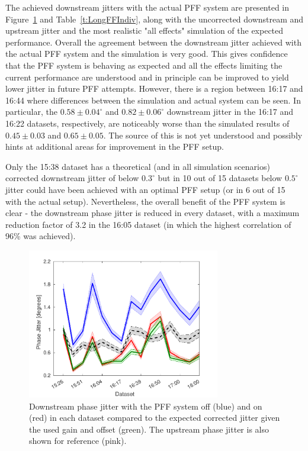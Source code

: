 The achieved downstream jitters with the actual PFF system are presented in Figure~\ref{f:longFF_jitDatSet} and Table~\ref{t:LongFFIndiv}, along with the uncorrected downstream and upstream jitter and the most realistic "all effects" simulation of the expected performance. Overall the agreement between the downstream jitter achieved with the actual PFF system and the simulation is very good. This gives confidence that the PFF system is behaving as expected and all the effects limiting the current performance are understood and in principle can be improved to yield lower jitter in future PFF attempts. However, there is a region between 16:17 and 16:44 where differences between the simulation and actual system can be seen. In particular, the \(0.58\pm0.04^\circ\) and \(0.82\pm0.06^\circ\) downstream jitter in the 16:17 and 16:22 datasets, respectively, are noticeably worse than the simulated results of \(0.45\pm0.03\) and \(0.65\pm0.05\). The source of this is not yet understood and possibly hints at additional areas for improvement in the PFF setup.

Only the 15:38 dataset has a theoretical (and in all simulation scenarios) corrected downstream jitter of below \(0.3^\circ\) but in 10 out of 15 datasets below \(0.5^\circ\) jitter could have been achieved with an optimal PFF setup (or in 6 out of 15 with the actual setup). Nevertheless, 
the overall benefit of the PFF system is clear - the downstream phase jitter is reduced in every dataset, with a maximum reduction factor of 3.2 in the 16:05 dataset (in which the highest correlation of 96\% was achieved).


\begin{figure}
  \centering
  \includegraphics[width=0.75\textwidth]{Figures/feedforward/longFF_jitDatSet}
  \caption{Downstream phase jitter with the PFF system off (blue) and on (red) in each dataset compared to the expected corrected jitter given the used gain and offset (green). The upstream phase jitter is also shown for reference (pink).}
  \label{f:longFF_jitDatSet}
\end{figure}

